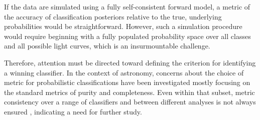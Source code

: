 If the data are simulated using a fully self-consistent forward model, a metric of the accuracy of classification posteriors relative to the true, underlying probabilities would be straightforward.
However, such a simulation procedure would require beginning with a fully populated probability space over all classes and all possible light curves, which is an insurmountable challenge.

Therefore, attention must be directed toward defining the criterion for identifying a winning classifier.
In the context of astronomy, concerns about the choice of metric for probabilistic classifications have been investigated \citep{florios_forecasting_2018, kim_stargalaxy_2017} mostly focusing on the standard metrics of purity and completeness.
Even within that subset, metric consistency over a range of classifiers and between different analyses is not always ensured \citep{bethapudi_separation_2018}, indicating a need for further study.

